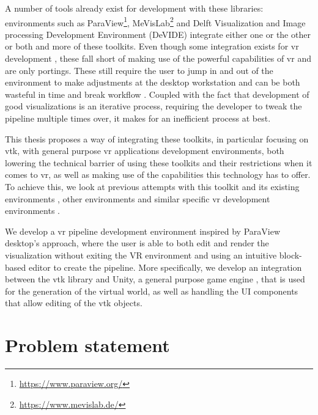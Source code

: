 A number of tools already exist for development with these libraries: environments such as ParaView\footnote{\url{https://www.paraview.org/}}, MeVisLab\footnote{\url{https://www.mevislab.de/}} and Delft Visualization and Image processing Development Environment (DeVIDE) \cite{botha_devide_2004} integrate either one or the other or both and more of these toolkits. Even though some integration exists for \acrshort{vr} development \cite{sua_virtual_2015, shetty_immersive_2011}, these fall short of making use of the powerful capabilities of \acrshort{vr} and are only portings. These still require the user to jump in and out of the environment to make adjustments at the desktop workstation and can be both wasteful in time and break workflow \cite{belleman_interactive_2003, dreuning_visual_2016, kruis_creating_2017, schutte_virtual_2018}. Coupled with the fact that development of good visualizations is an iterative process, requiring the developer to tweak the pipeline multiple times over, it makes for an inefficient process at best.

This thesis proposes a way of integrating these toolkits, in particular focusing on \acrshort{vtk}, with general purpose \acrshort{vr} applications development environments, both lowering the technical barrier of using these toolkits and their restrictions when it comes to \acrshort{vr}, as well as making use of the capabilities this technology has to offer. To achieve this, we look at previous attempts with this toolkit and its existing environments \cite{dreuning_visual_2016, kruis_creating_2017, schutte_virtual_2018}, other environments \cite{wheeler_virtual_2018} and similar specific \acrshort{vr} development environments \cite{vanhorn_deep_2019}.

We develop a \acrshort{vr} pipeline development environment inspired by ParaView desktop's approach, where the user is able to both edit and render the visualization without exiting the VR environment and using an intuitive block-based editor to create the pipeline. More specifically, we develop an integration between the \acrshort{vtk} library and Unity, a general purpose game engine \cite{haas2014history}, that is used for the generation of the virtual world, as well as handling the UI components that allow editing of the \acrshort{vtk} objects.

\section{Problem statement}

